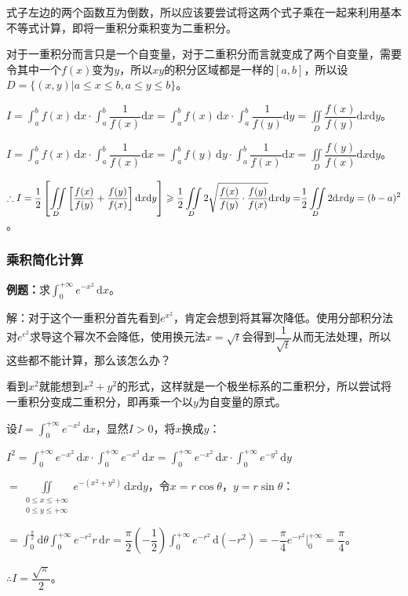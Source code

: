 \documentclass[UTF8, 12pt]{ctexart}
\begin{document}
式子左边的两个函数互为倒数，所以应该要尝试将这两个式子乘在一起来利用基本不等式计算，即将一重积分乘积变为二重积分。

对于一重积分而言只是一个自变量，对于二重积分而言就变成了两个自变量，需要令其中一个$f(x)$变为$y$，所以$xy$的积分区域都是一样的$[a,b]$，所以设$D=\{(x,y)\vert a\leqslant x\leqslant b,a\leqslant y\leqslant b\}$。

$I=\displaystyle{\int_a^bf(x)\,\textrm{d}x\cdot\int_a^b\dfrac{1}{f(x)}\textrm{d}x}=\int_a^bf(x)\,\textrm{d}x\cdot\int_a^b\dfrac{1}{f(y)}\textrm{d}y=\iint\limits_D\dfrac{f(x)}{f(y)}\textrm{d}x\textrm{d}y$。

$I=\displaystyle{\int_a^bf(x)\,\textrm{d}x\cdot\int_a^b\dfrac{1}{f(x)}\textrm{d}x}=\int_a^bf(y)\,\textrm{d}y\cdot\int_a^b\dfrac{1}{f(x)}\textrm{d}x=\iint\limits_D\dfrac{f(y)}{f(x)}\textrm{d}x\textrm{d}y$。

$\therefore I=\displaystyle{\dfrac{1}{2}\left[\iint\limits_D\left[\dfrac{f(x)}{f(y)}+\dfrac{f(y)}{f(x)}\right]\textrm{d}x\textrm{d}y\right]\geqslant\dfrac{1}{2}\iint\limits_D2\sqrt{\dfrac{f(x)}{f(y)}\cdot\dfrac{f(y)}{f(x)}}\textrm{d}x\textrm{d}y=}\\\displaystyle{\dfrac{1}{2}\iint\limits_D2\textrm{d}x\textrm{d}y}=(b-a)^2$。

\subsubsection{乘积简化计算}

\textbf{例题：}求$\int_0^{+\infty}e^{-x^2}\,\textrm{d}x$。

解：对于这个一重积分首先看到$e^{x^2}$，肯定会想到将其幂次降低。使用分部积分法对$e^{e^2}$求导这个幂次不会降低，使用换元法$x=\sqrt{t}$会得到$\dfrac{1}{\sqrt{t}}$从而无法处理，所以这些都不能计算，那么该怎么办？

看到$x^2$就能想到$x^2+y^2$的形式，这样就是一个极坐标系的二重积分，所以尝试将一重积分变成二重积分，即再乘一个以$y$为自变量的原式。

设$I=\int_0^{+\infty}e^{-x^2}\,\textrm{d}x$，显然$I>0$，将$x$换成$y$：

$I^2=\int_0^{+\infty}e^{-x^2}\,\textrm{d}x\cdot\int_0^{+\infty}e^{-x^2}\,\textrm{d}x=\int_0^{+\infty}e^{-x^2}\,\textrm{d}x\cdot\int_0^{+\infty}e^{-y^2}\,\textrm{d}y$

$=\displaystyle{\iint\limits_{\substack{0\leqslant x\leqslant+\infty\\0\leqslant y\leqslant+\infty}}e^{-(x^2+y^2)}\,\textrm{d}x\textrm{d}y}$，令$x=r\cos\theta$，$y=r\sin\theta$：

$=\displaystyle{\int_0^\frac{\pi}{2}\textrm{d}\theta\int_0^{+\infty}e^{-r^2}r\,\textrm{d}r=\dfrac{\pi}{2}\left(-\dfrac{1}{2}\right)\int_0^{+\infty}e^{-r^2}\,\textrm{d}(-r^2)=-\dfrac{\pi}{4}e^{-r^2}\bigg\vert_0^{+\infty}}=\dfrac{\pi}{4}$。

$\therefore I=\dfrac{\sqrt{\pi}}{2}$。
\end{document}

